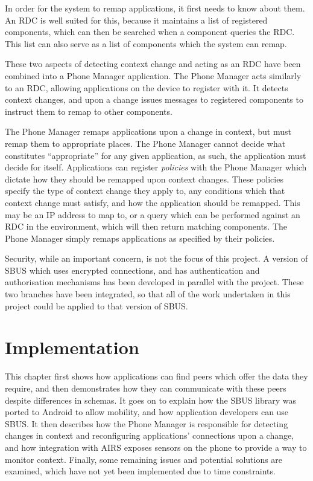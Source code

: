 \documentclass[12pt,twoside,notitlepage]{report}
\begin{document}
In order for the system to remap applications, it first needs to know about them. 
An RDC is well suited for this, because it maintains a list of registered components, which can then be searched when a component queries the RDC. 
This list can also serve as a list of components which the system can remap.

These two aspects of detecting context change and acting as an RDC have been combined into a Phone Manager application. 
The Phone Manager acts similarly to an RDC, allowing applications on the device to register with it. 
It detects context changes, and upon a change issues messages to registered components to instruct them to remap to other components.

The Phone Manager remaps applications upon a change in context, but must remap them to appropriate places. 
The Phone Manager cannot decide what constitutes ``appropriate'' for any given application, as such, the application must decide for itself. 
Applications can register {\sl policies} with the Phone Manager which dictate how they should be remapped upon context changes. 
These policies specify the type of context change they apply to, any conditions which that context change must satisfy, and how the application should be remapped. 
This may be an IP address to map to, or a query which can be performed against an RDC in the environment, which will then return matching components. 
The Phone Manager simply remaps applications as specified by their policies.

Security, while an important concern, is not the focus of this project. 
A version of SBUS which uses encrypted connections, and has authentication and authorisation mechanisms has been developed in parallel with the project. 
These two branches have been integrated, so that all of the work undertaken in this project could be applied to that version of SBUS.

\cleardoublepage


\chapter{Implementation}

This chapter first shows how applications can find peers which offer the data they require, and then demonstrates how they can communicate with these peers despite differences in schemas. 
It goes on to explain how the SBUS library was ported to Android to allow mobility, and how application developers can use SBUS. 
It then describes how the Phone Manager is responsible for detecting changes in context and reconfiguring applications' connections upon a change, and how integration with AIRS exposes sensors on the phone to provide a way to monitor context. 
Finally, some remaining issues and potential solutions are examined, which have not yet been implemented due to time constraints. 
\end{document}
